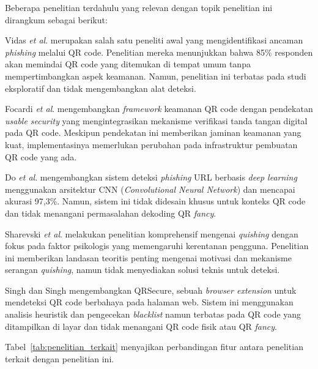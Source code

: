 \documentclass[conference]{IEEEtran}
\begin{document}
Beberapa penelitian terdahulu yang relevan dengan topik penelitian ini dirangkum sebagai berikut:

Vidas \textit{et al}. \cite{vidas_qrishing_2013} merupakan salah satu peneliti awal yang mengidentifikasi ancaman \textit{phishing} melalui QR code. Penelitian mereka menunjukkan bahwa 85\% responden akan memindai QR code yang ditemukan di tempat umum tanpa mempertimbangkan aspek keamanan. Namun, penelitian ini terbatas pada studi eksploratif dan tidak mengembangkan alat deteksi.

Focardi \textit{et al}. \cite{focardi_usable_2019} mengembangkan \textit{framework} keamanan QR code dengan pendekatan \textit{usable security} yang mengintegrasikan mekanisme verifikasi tanda tangan digital pada QR code. Meskipun pendekatan ini memberikan jaminan keamanan yang kuat, implementasinya memerlukan perubahan pada infrastruktur pembuatan QR code yang ada.

Do \textit{et al}. \cite{do_phishing_2022} mengembangkan sistem deteksi \textit{phishing} URL berbasis \textit{deep learning} menggunakan arsitektur CNN (\textit{Convolutional Neural Network}) dan mencapai akurasi 97,3\%. Namun, sistem ini tidak didesain khusus untuk konteks QR code dan tidak menangani permasalahan dekoding QR \textit{fancy}.

Sharevski \textit{et al}. \cite{sharevski_qr_2022} melakukan penelitian komprehensif mengenai \textit{quishing} dengan fokus pada faktor psikologis yang memengaruhi kerentanan pengguna. Penelitian ini memberikan landasan teoritis penting mengenai motivasi dan mekanisme serangan \textit{quishing}, namun tidak menyediakan solusi teknis untuk deteksi.

Singh dan Singh \cite{singh_qrsecure_2023} mengembangkan QRSecure, sebuah \textit{browser extension} untuk mendeteksi QR code berbahaya pada halaman web. Sistem ini menggunakan analisis heuristik dan pengecekan \textit{blacklist} namun terbatas pada QR code yang ditampilkan di layar dan tidak menangani QR code fisik atau QR \textit{fancy}.

Tabel~\ref{tab:penelitian_terkait} menyajikan perbandingan fitur antara penelitian terkait dengan penelitian ini.
\end{document}
